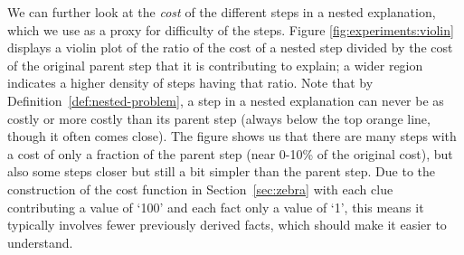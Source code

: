 We can further look at the \textit{cost} of the different steps in a nested explanation, which we use as a proxy for difficulty of the steps. 
Figure \ref{fig:experiments:violin} displays a violin plot of the ratio of the cost of a nested step divided by the cost of the original parent step that it is contributing to explain; a wider region indicates a higher density of steps having that ratio. 
Note that by Definition~\ref{def:nested-problem}, a step in a nested explanation can never be as costly or more costly than its parent step (always below the top orange line, though it often comes close).
The figure shows us that there are many steps with a cost of only a fraction of the parent step (near 0-10\% of the original cost), but also some steps closer but still a bit simpler than the parent step. 
Due to the construction of the cost function in Section~\ref{sec:zebra} with each clue contributing a value of `100' and each fact only a value of `1', this means it typically involves fewer previously derived facts, which should make it easier to understand. 



